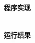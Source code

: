 \documentclass{academics}
\begin{document}
\paragraph{程序实现} {
    \inputminted[label=Solution.java]{java}{../src/P16/Solution.java}
}

\paragraph{运行结果} {
    \inputminted{text}{../res/P16.out}
}
\end{document}
